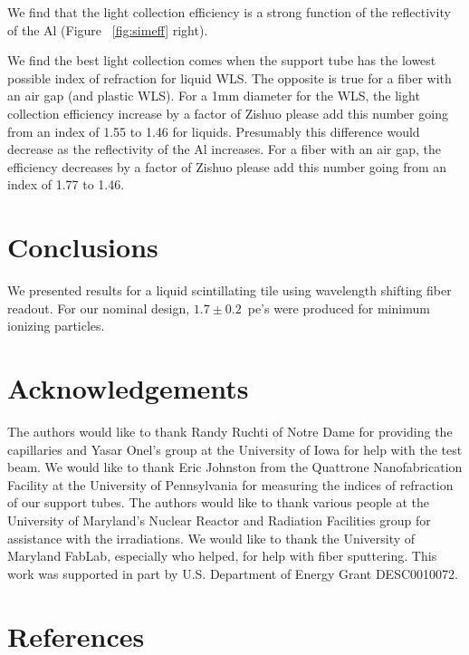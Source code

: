 \documentclass[review]{elsarticle}
\begin{document}
We find that the light collection efficiency is a strong function of
the reflectivity of the Al (Figure ~\ref{fig:simeff} right).

We find the best light collection comes when the support tube has the
lowest possible index of refraction for liquid WLS. The opposite is
true for a fiber with an air gap (and plastic WLS). For a 1mm
diameter for the WLS, the light collection efficiency increase by a
factor of {\color{red} Zishuo please add this number} going from an
index of 1.55 to 1.46 for liquids. Presumably this difference would
decrease as the reflectivity of the Al increases. For a fiber with an
air gap, the efficiency decreases by a factor of {\color{red} Zishuo
 please add this number} going from an index of 1.77 to 1.46.

\section{Conclusions}

We presented results for a liquid scintillating tile using wavelength
shifting fiber readout. For our nominal design, $1.7\pm 0.2$~pe's
were produced for minimum ionizing particles.

\section{Acknowledgements}
The authors would like to thank Randy Ruchti of Notre Dame for
providing the capillaries and Yasar Onel's group at the University of
Iowa for help with the test beam. We would like to thank Eric
Johnston from the Quattrone Nanofabrication Facility at the University
of Pennsylvania for measuring the indices of refraction of our support
tubes. 
The authors would like to thank {\color{red} various people} at
the University of Maryland's Nuclear Reactor and Radiation
Facilities group for assistance
with the irradiations.
 We would like to thank the University of Maryland
FabLab, especially {\color{red} who helped}, for help with fiber sputtering.
This work was supported in part by U.S. Department of Energy
Grant DESC0010072.

\section*{References}


\end{document}
